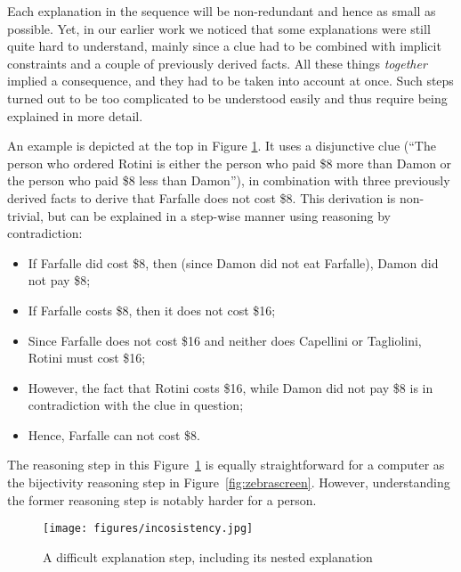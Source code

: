 Each explanation in the sequence will be non-redundant and hence as small as possible. Yet, in our earlier work we noticed that some explanations were still quite hard to understand, mainly since a clue had to be combined with implicit constraints and a couple of previously derived facts. All these things \textit{together} implied a consequence, and they had to be taken into account at once.
Such steps turned out to be too complicated to be understood easily and thus require being explained in more detail.

An example is depicted at the top in Figure \ref{fig:pasta_diff}.
It uses a disjunctive clue (``The person who ordered Rotini is either the person who paid \$8 more than Damon or the person who paid \$8 less than Damon''), in combination with three previously derived facts to derive that Farfalle does not cost \$8.
This derivation is non-trivial, but can be explained in a step-wise manner using reasoning by contradiction:
 \begin{itemize}
  \item If Farfalle did cost \$8, then (since Damon did not eat Farfalle), Damon did not pay \$8;
  \item If Farfalle costs \$8, then it does not cost \$16; 
  \item Since Farfalle does not cost \$16 and neither does Capellini or Tagliolini, Rotini must cost \$16;
  \item However, the fact that Rotini costs \$16, while Damon did not pay \$8 is in contradiction with the clue in question;
  \item Hence, Farfalle can not cost \$8.
 \end{itemize}
The reasoning step in this Figure~\ref{fig:pasta_diff} is equally straightforward for a computer as the bijectivity reasoning step in Figure~\ref{fig:zebrascreen}. However, understanding the former reasoning step is notably harder for a person. %

\begin{figure}[t!]
	\centering
    \texttt{[image: figures/incosistency.jpg]}
    \caption{A difficult explanation step, including its nested explanation}\label{fig:pasta_diff}
\end{figure}

